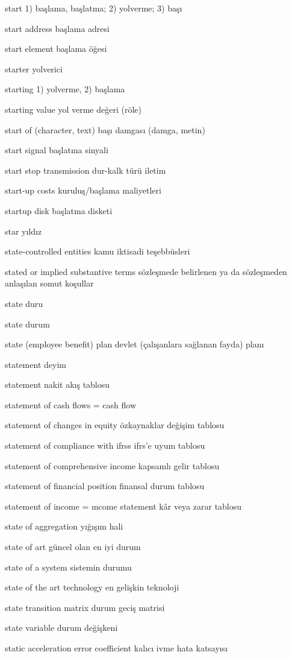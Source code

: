 \documentclass[12pt,fleqn]{article}\usepackage{../../common}
\begin{document}
start 1) başlama, başlatma; 2) yolverme; 3) başı

start address başlama adresi

start element başlama öğesi

starter yolverici

starting 1) yolverme, 2) başlama

starting value yol verme değeri (röle)

start of (character, text) başı damgası (damga, metin)

start signal başlatma sinyali

start stop transmission dur-kalk türü iletim

start-up costs kuruluş/başlama maliyetleri

startup disk başlatma disketi

star yıldız

state-controlled entities kamu iktisadi teşebbüsleri

stated or implied substantive terms sözleşmede belirlenen ya da sözleşmeden anlaşılan somut koşullar

state duru

state durum

state (employee benefit) plan devlet (çalışanlara sağlanan fayda) planı

statement deyim

statement nakit akış tablosu

statement of cash flows = cash flow

statement of changes in equity özkaynaklar değişim tablosu

statement of compliance with ifrss ifrs'e uyum tablosu

statement of comprehensive income kapsamlı gelir tablosu

statement of financial position finansal durum tablosu

statement of income = ıncome statement kâr veya zarar tablosu

state of aggregation yığışım hali

state of art güncel olan en iyi durum

state of a system sistemin durumu

state of the art technology en gelişkin teknoloji

state transition matrix durum geciş matrisi

state variable durum değişkeni

static acceleration error coefficient kalıcı ivme hata katsayısı
\end{document}
